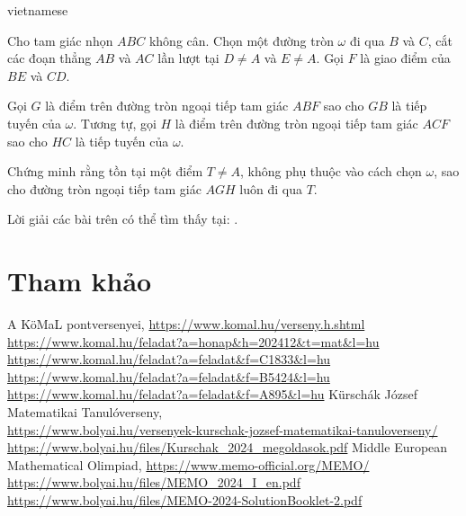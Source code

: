 \documentclass{article}
\begin{document}
\begin{otherlanguage*}{vietnamese}
\begin{problem*}
    Cho tam giác nhọn \( ABC \) không cân. Chọn một đường tròn \( \omega \) đi qua \( B \) và \( C \),
    cắt các đoạn thẳng \( AB \) và \( AC \) lần lượt tại \( D \neq A \) và \( E \neq A \). Gọi \( F \) là giao điểm của \( BE \) và \( CD \).  
    
    Gọi \( G \) là điểm trên đường tròn ngoại tiếp tam giác \( ABF \) sao cho \( GB \) là tiếp tuyến của \( \omega \).
    Tương tự, gọi \( H \) là điểm trên đường tròn ngoại tiếp tam giác \( ACF \) sao cho \( HC \) là tiếp tuyến của \( \omega \).  
    
    Chứng minh rằng tồn tại một điểm \( T \neq A \), không phụ thuộc vào cách chọn \( \omega \), sao cho đường tròn ngoại tiếp tam giác \( AGH \) luôn đi qua \( T \).
\end{problem*}

\begin{remark*}
    Lời giải các bài trên có thể tìm thấy tại: \cite{m_2024_s}.
\end{remark*}

\newpage

\section*{Tham khảo}

\begin{thebibliography}{99}
     A KöMaL pontversenyei, \url{https://www.komal.hu/verseny.h.shtml}
     \url{https://www.komal.hu/feladat?a=honap&h=202412&t=mat&l=hu}
     \url{https://www.komal.hu/feladat?a=feladat&f=C1833&l=hu}
     \url{https://www.komal.hu/feladat?a=feladat&f=B5424&l=hu}
     \url{https://www.komal.hu/feladat?a=feladat&f=A895&l=hu}
     Kürschák József Matematikai Tanulóverseny,\\ \url{https://www.bolyai.hu/versenyek-kurschak-jozsef-matematikai-tanuloverseny/}
     \url{https://www.bolyai.hu/files/Kurschak_2024_megoldasok.pdf}
     Middle European Mathematical Olimpiad, \url{https://www.memo-official.org/MEMO/}
     \url{https://www.bolyai.hu/files/MEMO_2024_I_en.pdf}
     \url{https://www.bolyai.hu/files/MEMO-2024-SolutionBooklet-2.pdf}
\end{thebibliography}

\end{otherlanguage*}
\end{document}
